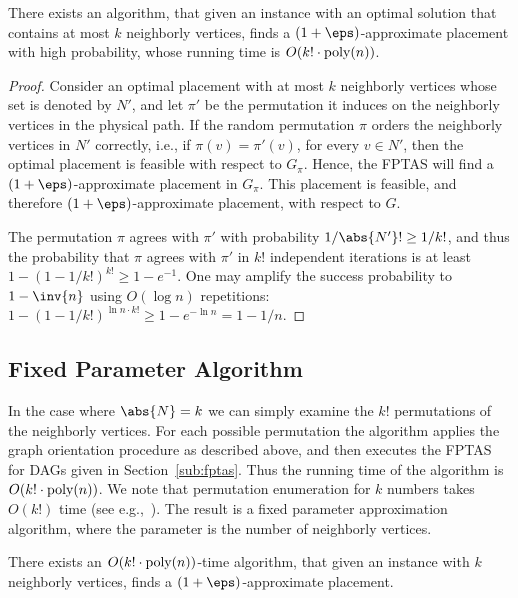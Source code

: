 \begin{theorem}
There exists an algorithm, that given an \scp instance with an optimal
solution that contains at most $k$ neighborly vertices, finds a
$(1+\eps)$-approximate placement with high probability, whose
running time is $O(k! \cdot \text{\rm poly}(n))$.
\end{theorem}
\begin{proof}
Consider an optimal placement with at most $k$ neighborly vertices
whose set is denoted by $N'$, and let $\pi'$ be the permutation it
induces on the neighborly vertices in the physical path.
%
If the random permutation $\pi$ orders the neighborly vertices in $N'$
correctly, i.e., if $\pi(v) = \pi'(v)$, for every $v \in N'$, then the
optimal placement is feasible with respect to $G_\pi$.  Hence, the
FPTAS will find a $(1+\eps)$-approximate placement in $G_\pi$.  This
placement is feasible, and therefore $(1+\eps)$-approximate placement,
with respect to $G$.

The permutation $\pi$ agrees with $\pi'$ with probability $1/\abs{N'}!
\geq 1/k!$, and thus the probability that $\pi$ agrees with $\pi'$ in
$k!$ independent iterations is at least $1 - (1 - 1/k!)^{k!} \geq 1 -
e^{-1}$.  One may amplify the success probability to $1 - \inv{n}$
using $O(\log n)$ repetitions: $1 - (1 - 1/k!)^{\ln n \cdot k!} \geq 1
- e^{-\ln n} = 1 - 1/n$.
\end{proof}


\subsection{Fixed Parameter Algorithm}

In the case where $\abs{N} = k$ we can simply examine the $k!$
permutations of the neighborly vertices.  For each possible
permutation the algorithm applies the graph orientation procedure as
described above, and then executes the FPTAS for DAGs given in
Section~\ref{sub:fptas}.  Thus the running time of the algorithm is
$O(k! \cdot \text{\rm poly}(n))$.
%
We note that permutation enumeration for $k$ numbers takes $O(k!)$
time (see e.g.,~\cite{Even73,Sedgewick77}).
%
The result is a fixed parameter approximation algorithm, where the
parameter is the number of neighborly vertices.

\begin{theorem}
There exists an $O(k! \cdot \text{\rm poly}(n))$-time algorithm, that
given an \scp instance with $k$ neighborly vertices, finds a
$(1+\eps)$-approximate placement.
\end{theorem}

